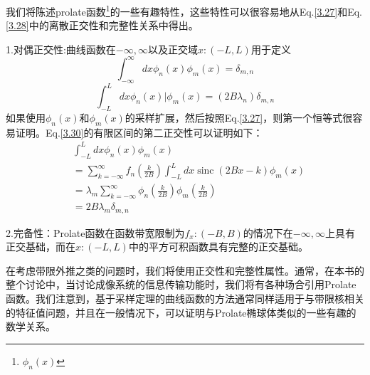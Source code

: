 \documentclass[10pt, UTF8]{ctexart}%
\newcommand{\InsertEqution}[2]{\begin{equation}
  \label{#1}
   #2
 \end{equation}}
\newcommand{\RefEq}[1]{Eq.\ref{#1}}
\newcommand{\InsertInlineEq}[1]{$#1$}
\begin{document}
\begin{sloppypar}
我们将陈述prolate函数\footnote{\InsertInlineEq{\phi_n(x)}}的一些有趣特性，这些特性可以很容易地从\RefEq{3.27}和\RefEq{3.28}中的离散正交性和完整性关系中得出。

1.对偶正交性:曲线函数在\InsertInlineEq{-\infty,\infty}以及正交域\InsertInlineEq{x:(-L,L)}用于定义\InsertEqution{3.29}{\int_{-\infty}^{\infty} d x \phi_{n}(x) \phi_{m}(x)=\delta_{m, n}}
\InsertEqution{3.30}{\int_{-L}^{L}d x \phi_{n}(x) | \phi_{m}(x)=\left(2 B \lambda_{n}\right) \delta_{m, n}}
如果使用\InsertInlineEq{\phi_n(x)}和\InsertInlineEq{\phi_m(x)}的采样扩展，然后按照\RefEq{3.27}，则第一个恒等式很容易证明。\RefEq{3.30}的有限区间的第二正交性可以证明如下：\InsertEqution{3.31}{\begin{aligned}
  &\int_{-L}^{L} d x \phi_{n}(x) \phi_{m}(x) \\
  &=\sum\limits_{k=-\infty}^{\infty} f_{n}\left(\frac{k}{2 B}\right) \int_{-L}^{L} d x \operatorname{sinc}(2 B x-k) \phi_{m}(x) \\
  &=\lambda_{m} \sum\limits_{k=-\infty}^{\infty} \phi_{n}\left(\frac{k}{2 B}\right) \phi_{m}\left(\frac{k}{2 B}\right) \\
 & =2 B \lambda_{m} \delta_{m, n}
  \end{aligned}}

  2.完备性：Prolate函数在函数带宽限制为\InsertInlineEq{f_x:(-B,B)}的情况下在\InsertInlineEq{-\infty,\infty}上具有正交基础，而在\InsertInlineEq{x:(-L,L)}中的平方可积函数具有完整的正交基础。

  在考虑带限外推之类的问题时，我们将使用正交性和完整性属性。通常，在本书的整个讨论中，当讨论成像系统的信息传输功能时，我们将有各种场合引用Prolate函数。我们注意到，基于采样定理的曲线函数的方法通常同样适用于与带限核相关的特征值问题，并且在一般情况下，可以证明与Prolate椭球体类似的一些有趣的数学关系。

\end{sloppypar}
\end{document}
